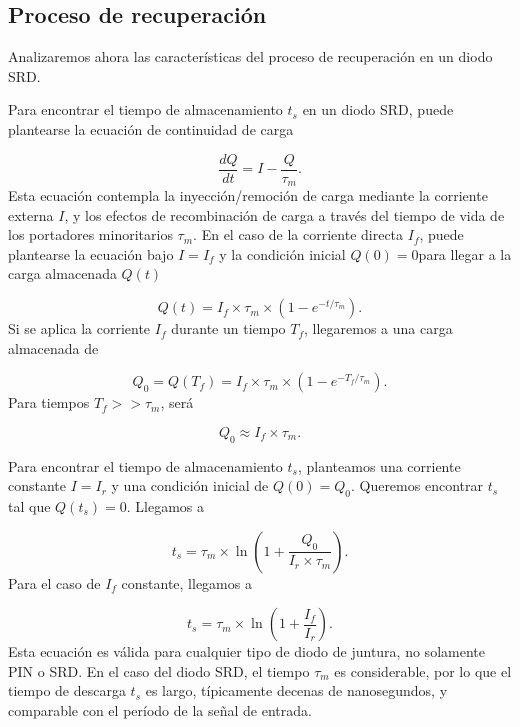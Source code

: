 \subsection{Proceso de recuperación}

Analizaremos ahora las características del proceso de recuperación en un diodo
SRD.

Para encontrar el tiempo de almacenamiento $t_s$ en un diodo SRD, puede
plantearse la ecuación de continuidad de carga \cite{moll1962} \cite{moll1969}

\begin{equation}
    \frac{dQ}{dt} = I-\frac{Q}{\tau_m}.
\end{equation}
Esta ecuación contempla la inyección/remoción de carga mediante la corriente
externa $I$, y los efectos de recombinación de carga a través del tiempo de vida
de los portadores minoritarios $\tau_m$. En el caso de la corriente directa
$I_f$, puede plantearse la ecuación bajo $I=I_f$ y la condición inicial $Q(0)=0$para llegar a la carga almacenada $Q(t)$

\begin{equation}
    Q(t) = I_f \times \tau_m \times \left( 1-e^{-t/\tau_m}\right).
\end{equation}
Si se aplica la corriente $I_f$ durante un tiempo $T_f$, llegaremos a una carga
almacenada de

\begin{equation}
    Q_0 = Q(T_f) = I_f \times \tau_m \times \left( 1-e^{-T_f/\tau_m}\right).
\end{equation}
Para tiempos $T_f >> \tau_m$, será

\begin{equation}
    Q_0 \approx I_f \times \tau_m.
\end{equation}

Para encontrar el tiempo de almacenamiento $t_s$, planteamos una corriente
constante $I=I_r$ y una condición inicial de $Q(0)=Q_0$. Queremos encontrar
$t_s$ tal que $Q(t_s) = 0$. Llegamos a

\begin{equation}
    t_s = \tau_m \times \ln \left( 1+\frac{Q_0}{I_r \times \tau_m}\right).
\end{equation}
Para el caso de $I_f$ constante, llegamos a

\begin{equation}
    t_s = \tau_m \times \ln \left( 1+\frac{I_f}{I_r}\right).
\end{equation}
Esta ecuación es válida para cualquier tipo de diodo de juntura, no solamente
PIN o SRD. En el caso del diodo SRD, el tiempo $\tau_m$ es considerable, por lo
que el tiempo de descarga $t_s$ es largo, típicamente decenas de nanosegundos, y comparable con el período de la señal de entrada.

